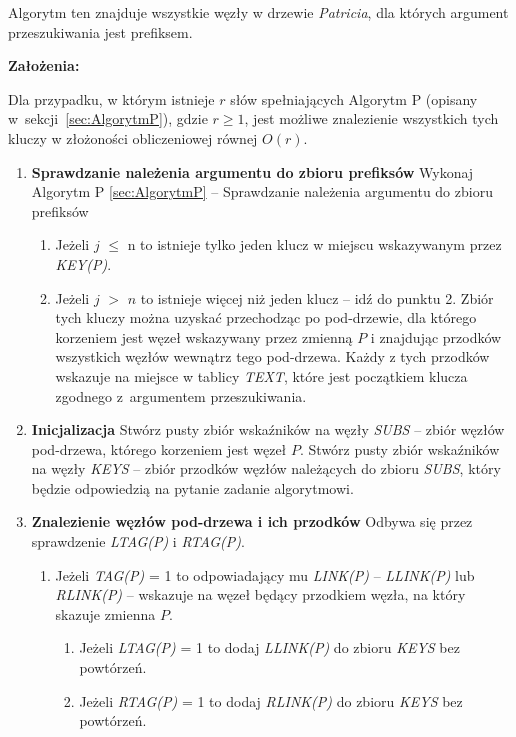 	Algorytm ten znajduje wszystkie węzły w drzewie \emph{Patricia}, dla których argument przeszukiwania jest prefiksem. 
	
	\textbf{Założenia:}
	
	Dla przypadku, w którym istnieje $r$ słów spełniających Algorytm P (opisany w~sekcji~\ref{sec:AlgorytmP}), gdzie $r \geq 1$, jest możliwe znalezienie wszystkich tych kluczy w złożoności obliczeniowej równej $O(r)$.
	
	\begin{enumerate}
		\item \textbf{Sprawdzanie należenia argumentu do zbioru prefiksów} \newline 
		Wykonaj Algorytm P \ref{sec:AlgorytmP} -- Sprawdzanie należenia argumentu do zbioru prefiksów
		\begin{enumerate}
			\item Jeżeli $j$ $\leq$ n to istnieje tylko jeden klucz w miejscu wskazywanym przez \emph{KEY(P)}.
			
			\item Jeżeli $j$ $>$ $n$ to istnieje więcej niż jeden klucz -- idź do punktu 2. \newline
			Zbiór tych kluczy można uzyskać przechodząc po pod-drzewie, dla którego korzeniem jest węzeł wskazywany przez zmienną $P$ i znajdując przodków wszystkich węzłów wewnątrz tego pod-drzewa. Każdy z tych przodków wskazuje na miejsce w tablicy \emph{TEXT}, które jest początkiem klucza zgodnego z~argumentem przeszukiwania.
		\end{enumerate}
			
		\item \textbf{Inicjalizacja} \newline
		Stwórz pusty zbiór wskaźników na węzły \emph{SUBS} -- zbiór węzłów pod-drzewa, którego korzeniem jest węzeł $P$. \newline
		Stwórz pusty zbiór wskaźników na węzły \emph{KEYS} -- zbiór przodków węzłów należących do zbioru \emph{SUBS}, który będzie odpowiedzią na pytanie zadanie algorytmowi. 
		
		\item \textbf{Znalezienie węzłów pod-drzewa i ich przodków} \newline
		Odbywa się przez sprawdzenie \emph{LTAG(P)} i \emph{RTAG(P)}.
		\begin{enumerate}
			\item Jeżeli \emph{TAG(P)} = 1 to odpowiadający mu \emph{LINK(P)} -- \emph{LLINK(P)} lub \emph{RLINK(P)} -- wskazuje na węzeł będący przodkiem węzła, na który skazuje zmienna $P$. 
			\begin{enumerate}
				\item Jeżeli \emph{LTAG(P)} = 1 to dodaj \emph{LLINK(P)} do zbioru \emph{KEYS} bez powtórzeń.
				\item Jeżeli \emph{RTAG(P)} = 1 to dodaj \emph{RLINK(P)} do zbioru \emph{KEYS} bez powtórzeń.
			\end{enumerate}
			

\end{enumerate}
\end{enumerate}

